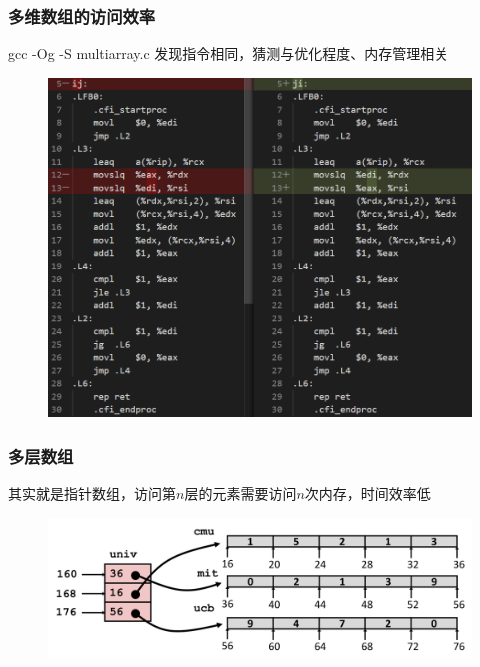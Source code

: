 \documentclass[12pt,AutoFakeBold,aspectratio=169,mathserif]{beamer}
\begin{document}
    \begin{frame}
        \frametitle{多维数组的访问效率}
    
        gcc -Og -S multiarray.c 发现指令相同，猜测与优化程度、内存管理相关
        \begin{figure}
            \includegraphics[height=.7\paperheight]{figures/ij.png}
        \end{figure}
    
    \end{frame}

    \begin{frame}
        \frametitle{多层数组}
    
        其实就是指针数组，访问第\(n\)层的元素需要访问\(n\)次内存，时间效率低

        \begin{figure}
            \includegraphics[width=\textwidth]{figures/multilevel.png}
        \end{figure}
    
    \end{frame}
\end{document}

